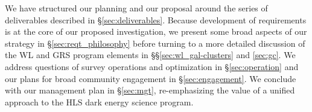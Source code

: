 We have structured our planning and our proposal around the series of
deliverables described in \S \ref{sec:deliverables}.  Because development of requirements is at the core of our proposed
investigation, we present some broad aspects of our strategy in \S \ref{sec:reqt_philosophy}
before turning to a more detailed discussion of the WL and GRS program
elements in \S\S \ref{sec:wl_gal-clusters} and \ref{sec:gc}.  We address questions of survey operations 
and optimization in \S \ref{sec:operation} and our plans for broad
community engagement in \S \ref{sec:engagement}. We conclude with our
management plan in \S \ref{sec:mgt}, re-emphasizing the value of a
unified approach to the HLS dark energy science program.  

